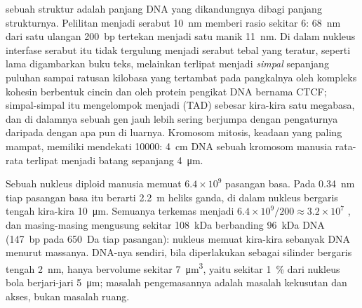\begin{proposition}\label{prop:b3:chromatin-epigenetics:compaction}
\emph{} sebuah struktur  adalah panjang DNA yang
dikandungnya dibagi panjang strukturnya. Pelilitan menjadi serabut
\qty{10}{nm} memberi rasio sekitar $6$: \qty{68}{nm} dari satu ulangan
\qty{200}{bp} tertekan menjadi satu manik \qty{11}{nm}. Di dalam nukleus
interfase serabut itu tidak tergulung menjadi serabut tebal yang teratur,
seperti lama digambarkan buku teks, melainkan terlipat menjadi \emph{simpal}
sepanjang puluhan sampai ratusan kilobasa yang tertambat pada pangkalnya oleh
kompleks kohesin berbentuk cincin dan oleh protein pengikat DNA bernama CTCF;
simpal-simpal itu mengelompok menjadi \emph{} (TAD)
sebesar kira-kira satu megabasa, dan di dalamnya sebuah gen jauh lebih sering
berjumpa dengan pengaturnya daripada dengan apa pun di luarnya. Kromosom
mitosis, keadaan yang paling mampat, memiliki  mendekati
\num{10000}: \qty{4}{cm} DNA sebuah kromosom manusia rata-rata terlipat
menjadi batang sepanjang \qty{4}{\micro m}.
\end{proposition}

\begin{example}\label{ex:b3:chromatin-epigenetics:two-metres}
Sebuah nukleus diploid manusia memuat $6.4\times 10^{9}$ pasangan basa. Pada
\qty{0.34}{nm} tiap pasangan basa itu berarti \qty{2.2}{m} heliks ganda, di
dalam nukleus bergaris tengah kira-kira \qty{10}{\micro m}. Semuanya terkemas
menjadi $6.4\times 10^{9}/200 \approx 3.2\times 10^{7}$ , dan
masing-masing mengusung sekitar \qty{108}{kDa}  berbanding \qty{96}{kDa}
DNA (\qty{147}{bp} pada \qty{650}{Da} tiap pasangan): nukleus memuat 
kira-kira sebanyak DNA menurut massanya. DNA-nya sendiri, bila diperlakukan
sebagai silinder bergaris tengah \qty{2}{nm}, hanya bervolume sekitar
\qty{7}{\micro m^3}, yaitu sekitar \qty{1}{\%} dari nukleus bola berjari-jari
\qty{5}{\micro m}; masalah pengemasannya adalah masalah kekusutan dan akses,
bukan masalah ruang.
\end{example}

